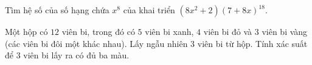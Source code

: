 \begin{bt}%
	Tìm hệ số của số hạng chứa $x^8$ của khai triển $ \displaystyle\left(8x^2+2 \right)\displaystyle\left(7+8x\right)^{18}$.
	
\end{bt}
\begin{bt}%
	Một hộp có $12$ viên bi, trong đó có $5$ viên bi xanh, $4$ viên bi đỏ và $3$ viên bi vàng (các viên bi đôi một khác nhau). Lấy ngẫu nhiên $3$ viên bi từ hộp. Tính xác suất để $3$ viên bi lấy ra có đủ ba màu. 
	
\end{bt}


